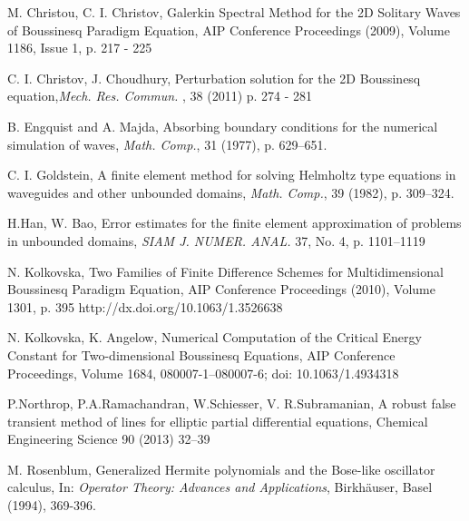 \documentclass[12pt]{article}
\theoremstyle{theorem}
\theoremstyle{defi}
\begin{document}
\begin{thebibliography}{99}
   M. Christou, C. I. Christov, Galerkin Spectral Method for the 2D Solitary Waves of Boussinesq Paradigm Equation, AIP Conference Proceedings (2009), Volume 1186, Issue 1, p. 217 - 225

 C. I. Christov, J. Choudhury, Perturbation solution for the 2D Boussinesq equation,{\it Mech. Res. Commun. }, 38 (2011) p. 274 - 281

 B. Engquist and A. Majda, Absorbing boundary conditions for the numerical simulation of waves, {\it Math. Comp.}, 31 (1977), p. 629–651.

  C. I. Goldstein, A finite element method for solving Helmholtz type equations in waveguides and other unbounded domains, {\it Math. Comp.}, 39 (1982), p. 309–324.

  H.Han, W. Bao, Error estimates for the finite element approximation of problems in unbounded domains,  {\it SIAM J. NUMER. ANAL.} 37, No. 4, p. 1101–1119

 N. Kolkovska, Two Families of Finite Difference Schemes for Multidimensional Boussinesq Paradigm Equation, AIP Conference Proceedings (2010), Volume 1301, p. 395 http://dx.doi.org/10.1063/1.3526638

 N. Kolkovska, K. Angelow, Numerical Computation of the Critical Energy Constant for Two-dimensional Boussinesq Equations,  AIP Conference Proceedings, Volume 1684, 080007-1–080007-6; doi: 10.1063/1.4934318

 P.Northrop, P.A.Ramachandran, W.Schiesser, V. R.Subramanian, A robust false transient method of lines for elliptic partial differential equations, Chemical Engineering Science 90 (2013) 32–39


 M. Rosenblum,
Generalized Hermite polynomials and the Bose-like oscillator
calculus, In: {\it Operator Theory: Advances and Applications},
Birkh\"auser, Basel (1994), 369-396.

\end{thebibliography}
\end{document}
